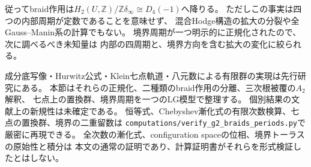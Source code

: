 従ってbraid作用は$H_2(U,\mathbb Z)/\mathbb Z\delta_\infty\cong D_4(-1)$へ降りる。
ただしこの事実は四つの内部周期が定数であることを意味せず、
混合Hodge構造の拡大の分裂や全Gauss--Manin系の計算でもない。
境界周期が一つ明示的に正規化されたので、次に調べるべき未知量は
内部の四周期と、境界方向を含む拡大の変化に絞られる。

\begin{remark}[既知性と検証範囲]
成分底写像・Hurwitz公式・Klein七点軌道・八元数による有限群の実現は先行研究にある。
本節はそれらの正規化、二種類のbraid作用の分離、三次根被覆の$A_2$解釈、
七点上の置換群、境界周期を一つのLG模型で整理する。
個別結果の文献上の新規性は未確定である。
恒等式、Chebyshev漸化式の有限次数検算、七点の置換群、境界の二重留数は
\texttt{computations/verify\_g2\_braids\_periods.py}で厳密に再現できる。
全次数の漸化式、configuration spaceの位相、境界トーラスの原始性と積分は
本文の通常の証明であり、計算証明書がそれらを形式検証したとはしない。
\end{remark}
